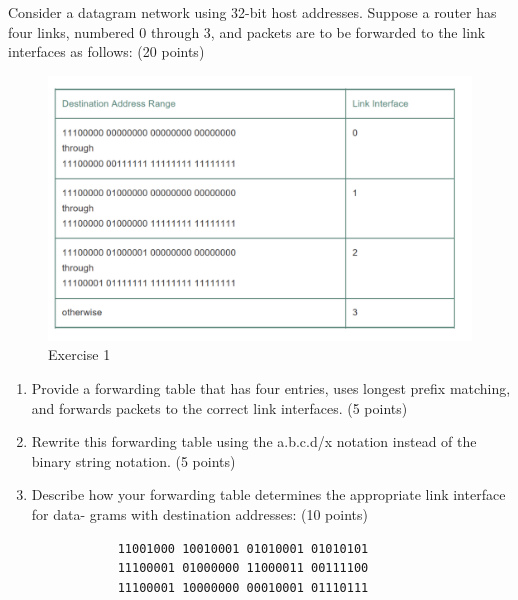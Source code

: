 \begin{exercise}[]{Consider a datagram network using 32-bit host addresses. Suppose a router has four links, numbered 0 through 3, and packets are to be forwarded to the link interfaces as follows: (20 points)
    \begin{figure}[hb]
      \begin{center}
      \includegraphics[width=12cm]{img/ass4/ex1}
      \caption{Exercise 1}
      \label{fig:ex1}
      \end{center}
    \end{figure}
    \begin{enumerate}
        \item Provide a forwarding table that has four entries, uses longest prefix matching, and forwards packets to the correct link interfaces. (5 points)
        \item Rewrite this forwarding table using the a.b.c.d/x notation instead of the binary string notation. (5 points)
        \item Describe how your forwarding table determines the appropriate link interface for data- grams with destination addresses: (10 points)
        \begin{verbatim}
            11001000 10010001 01010001 01010101
            11100001 01000000 11000011 00111100
            11100001 10000000 00010001 01110111
        \end{verbatim}
    \end{enumerate}
    }
  \begin{solution}
  \par{~}
  \begin{enumerate}

\end{enumerate}
\end{solution}
\end{exercise}
